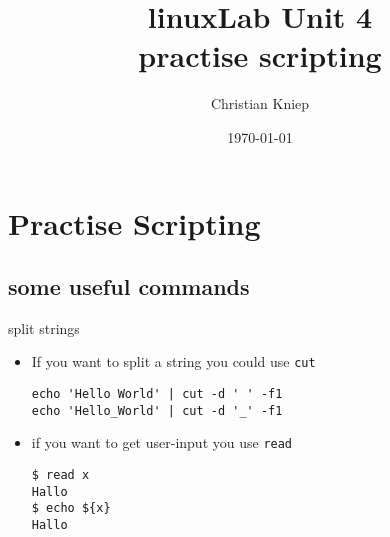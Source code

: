 \documentclass[handout]{beamer}
\author{Christian Kniep}
\newcommand{\code}[1]{\colorbox{lGray}{\texttt{#1}}}
\begin{document}
\title{linuxLab Unit 4 \\ practise scripting}  
\date[\today]{\today} 

\begin{frame}
	\titlepage
\end{frame} 


\section{Practise Scripting} 
 	\subsection{some useful commands}
		\begin{frame}[fragile]{split strings}
			\begin{itemize}
				\item<1-> If you want to split a string you could use \code{cut}
                \begin{verbatim}
echo 'Hello World' | cut -d ' ' -f1
echo 'Hello_World' | cut -d '_' -f1
\end{verbatim}
            \item<2-> if you want to get user-input you use \code{read}
            \begin{verbatim}
$ read x
Hallo
$ echo ${x} 
Hallo
\end{verbatim}
            \end{itemize}
		\end{frame}
\end{document}
